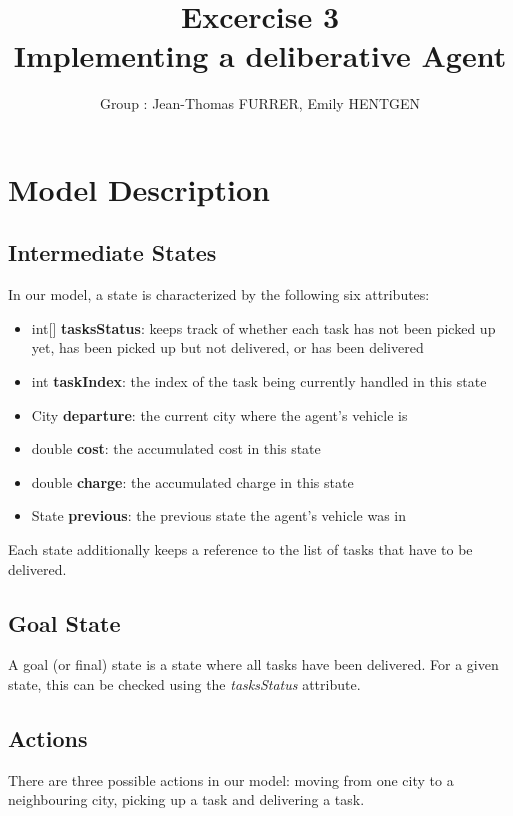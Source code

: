 \documentclass[10pt]{article}
\title{\bf Excercise 3\\ Implementing a deliberative Agent}
\author{Group \textnumero 23: Jean-Thomas FURRER, Emily HENTGEN}
\begin{document}
\maketitle

\section{Model Description}

\subsection{Intermediate States}
In our model, a state is characterized by the following six attributes:
\begin{itemize}
\itemsep 0mm
\item[\textendash]int[] \textbf{tasksStatus}: keeps track of whether each task has not been picked up yet, has been picked up but not delivered, or has been delivered
\item[\textendash]int \textbf{taskIndex}: the index of the task being currently handled in this state
\item[\textendash]City \textbf{departure}: the current city where the agent's vehicle is
\item[\textendash]double \textbf{cost}: the accumulated cost in this state
\item[\textendash]double \textbf{charge}: the accumulated charge in this state
\item[\textendash]State \textbf{previous}: the previous state the agent's vehicle was in
\end{itemize}

Each state additionally keeps a reference to the list of tasks that have to be delivered.

\subsection{Goal State}
A goal (or final) state is a state where all tasks have been delivered. For a given state, this can be checked using the \textit{tasksStatus} attribute.

\subsection{Actions}
There are three possible actions in our model: moving from one city to a neighbouring city, picking up a task and delivering a task.
\end{document}

